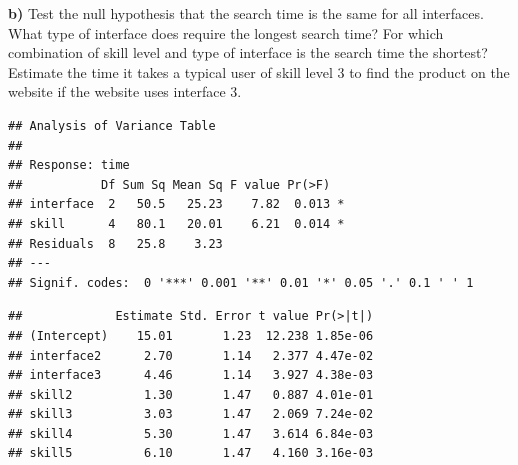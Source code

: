 \documentclass[
  10pt,
]{article}
\newenvironment{Shaded}{\begin{snugshade}}{\end{snugshade}}
\newcommand{\AttributeTok}[1]{\textcolor[rgb]{0.77,0.63,0.00}{#1}}
\newcommand{\CommentTok}[1]{\textcolor[rgb]{0.56,0.35,0.01}{\textit{#1}}}
\newcommand{\ConstantTok}[1]{\textcolor[rgb]{0.00,0.00,0.00}{#1}}
\newcommand{\FunctionTok}[1]{\textcolor[rgb]{0.00,0.00,0.00}{#1}}
\newcommand{\NormalTok}[1]{#1}
\newcommand{\OtherTok}[1]{\textcolor[rgb]{0.56,0.35,0.01}{#1}}
\newcommand{\SpecialCharTok}[1]{\textcolor[rgb]{0.00,0.00,0.00}{#1}}
\newcommand{\StringTok}[1]{\textcolor[rgb]{0.31,0.60,0.02}{#1}}
\begin{document}
\textbf{b)} Test the null hypothesis that the search time is the same
for all interfaces. What type of interface does require the longest
search time? For which combination of skill level and type of interface
is the search time the shortest? Estimate the time it takes a typical
user of skill level 3 to find the product on the website if the website
uses interface 3.

\begin{Shaded}
\end{Shaded}

\begin{verbatim}
## Analysis of Variance Table
## 
## Response: time
##           Df Sum Sq Mean Sq F value Pr(>F)  
## interface  2   50.5   25.23    7.82  0.013 *
## skill      4   80.1   20.01    6.21  0.014 *
## Residuals  8   25.8    3.23                 
## ---
## Signif. codes:  0 '***' 0.001 '**' 0.01 '*' 0.05 '.' 0.1 ' ' 1
\end{verbatim}

\begin{Shaded}
\end{Shaded}

\begin{verbatim}
##             Estimate Std. Error t value Pr(>|t|)
## (Intercept)    15.01       1.23  12.238 1.85e-06
## interface2      2.70       1.14   2.377 4.47e-02
## interface3      4.46       1.14   3.927 4.38e-03
## skill2          1.30       1.47   0.887 4.01e-01
## skill3          3.03       1.47   2.069 7.24e-02
## skill4          5.30       1.47   3.614 6.84e-03
## skill5          6.10       1.47   4.160 3.16e-03
\end{verbatim}
\end{document}
